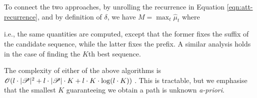 To connect the two approaches, by unrolling the recurrence in Equation \ref{eqn:att-recurrence}, and by definition of $\delta$, we have
$M = \max_t \widehat{\mu}_t$ where
%

\vspace{0.5\baselineskip}
\noindent i.e., the same quantities are computed, except that the former fixes the suffix of the candidate sequence, while the latter fixes the prefix.
A similar analysis holds in the case of finding the $K$th best sequence.

The complexity of either of the above algorithms is $\mathscr{O}( l \cdot |\mathscr{P}|^2 + l \cdot |\mathscr{P}| \cdot K + l \cdot K \cdot \log( l \cdot K ) )$ \citep{nilsson2001sequentially}.
This is tractable, but we emphasise that the smallest $K$ guaranteeing we obtain a path is unknown \emph{a-priori}.
